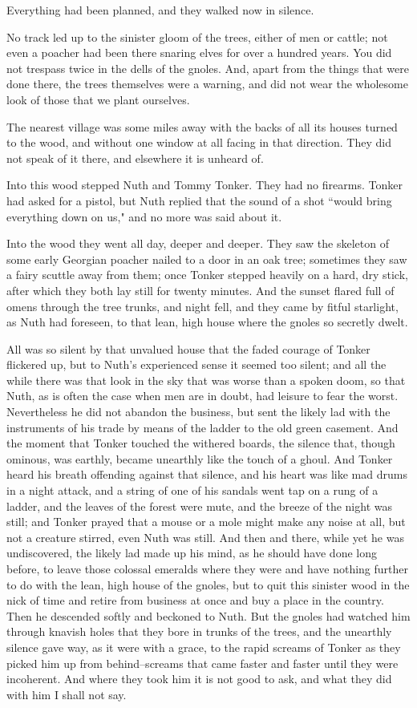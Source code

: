 \documentclass[12pt]{article}
\begin{document}
Everything had been planned, and they walked now in silence.

No track led up to the sinister gloom of the trees, either of men or
cattle; not even a poacher had been there snaring elves for over a
hundred years. You did not trespass twice in the dells of the gnoles.
And, apart from the things that were done there, the trees themselves
were a warning, and did not wear the wholesome look of those that we
plant ourselves.

The nearest village was some miles away with the backs of all its
houses turned to the wood, and without one window at all facing in
that direction. They did not speak of it there, and elsewhere it is
unheard of.

Into this wood stepped Nuth and Tommy Tonker. They had no firearms.
Tonker had asked for a pistol, but Nuth replied that the sound of a
shot ``would bring everything down on us," and no more was said about
it.

Into the wood they went all day, deeper and deeper. They saw the
skeleton of some early Georgian poacher nailed to a door in an oak
tree; sometimes they saw a fairy scuttle away from them; once Tonker
stepped heavily on a hard, dry stick, after which they both lay still
for twenty minutes. And the sunset flared full of omens through the
tree trunks, and night fell, and they came by fitful starlight, as
Nuth had foreseen, to that lean, high house where the gnoles so
secretly dwelt.

All was so silent by that unvalued house that the faded courage of
Tonker flickered up, but to Nuth's experienced sense it seemed too
silent; and all the while there was that look in the sky that was
worse than a spoken doom, so that Nuth, as is often the case when men
are in doubt, had leisure to fear the worst. Nevertheless he did not
abandon the business, but sent the likely lad with the instruments of
his trade by means of the ladder to the old green casement. And the
moment that Tonker touched the withered boards, the silence that,
though ominous, was earthly, became unearthly like the touch of a
ghoul. And Tonker heard his breath offending against that silence, and
his heart was like mad drums in a night attack, and a string of one of
his sandals went tap on a rung of a ladder, and the leaves of the
forest were mute, and the breeze of the night was still; and Tonker
prayed that a mouse or a mole might make any noise at all, but not a
creature stirred, even Nuth was still. And then and there, while yet
he was undiscovered, the likely lad made up his mind, as he should
have done long before, to leave those colossal emeralds where they
were and have nothing further to do with the lean, high house of the
gnoles, but to quit this sinister wood in the nick of time and retire
from business at once and buy a place in the country. Then he
descended softly and beckoned to Nuth. But the gnoles had watched him
through knavish holes that they bore in trunks of the trees, and the
unearthly silence gave way, as it were with a grace, to the rapid
screams of Tonker as they picked him up from behind--screams that came
faster and faster until they were incoherent. And where they took him
it is not good to ask, and what they did with him I shall not say.
\end{document}
